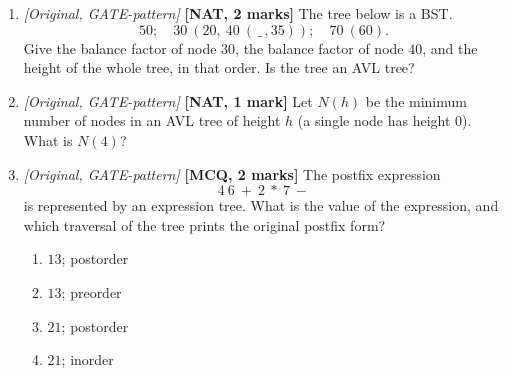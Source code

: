 \documentclass[11pt]{article}
\begin{document}
\begin{enumerate}
\item[\textbf{Q8}] \textit{[Original, GATE-pattern]} \textbf{[NAT, 2 marks]} The tree below is a BST.
\[
50;\quad 30\ (20,\ 40\ (\,\_\,,35));\quad 70\ (60).
\]
Give the balance factor of node $30$, the balance factor of node $40$, and the height of the whole tree, in that order. Is the tree an AVL tree? \underline{\hspace{4cm}}

\item[\textbf{Q9}] \textit{[Original, GATE-pattern]} \textbf{[NAT, 1 mark]} Let $N(h)$ be the minimum number of nodes in an AVL tree of height $h$ (a single node has height $0$). What is $N(4)$? \underline{\hspace{2cm}}

\item[\textbf{Q10}] \textit{[Original, GATE-pattern]} \textbf{[MCQ, 2 marks]} The postfix expression
\[
  4\ 6\ +\ 2\ *\ 7\ -
\]
is represented by an expression tree. What is the value of the expression, and which traversal of the tree prints the original postfix form?
\begin{enumerate}
  \item[(A)] $13$; postorder
  \item[(B)] $13$; preorder
  \item[(C)] $21$; postorder
  \item[(D)] $21$; inorder
\end{enumerate}
\end{enumerate}
\end{document}
